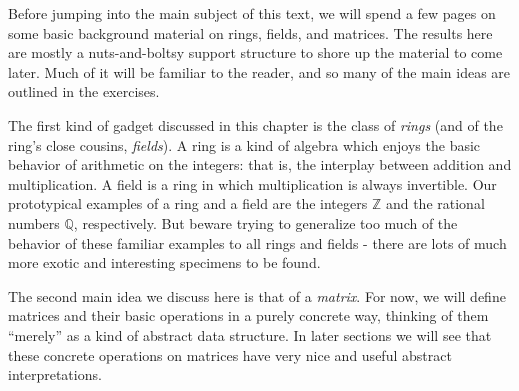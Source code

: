 
Before jumping into the main subject of this text, we will spend a few pages on some basic background material on rings, fields, and matrices. The results here are mostly a nuts-and-boltsy support structure to shore up the material to come later. Much of it will be familiar to the reader, and so many of the main ideas are outlined in the exercises.

The first kind of gadget discussed in this chapter is the class of \emph{rings} (and of the ring's close cousins, \emph{fields}). A ring is a kind of algebra which enjoys the basic behavior of arithmetic on the integers: that is, the interplay between addition and multiplication. A field is a ring in which multiplication is always invertible. Our prototypical examples of a ring and a field are the integers $\mathbb{Z}$ and the rational numbers $\mathbb{Q}$, respectively. But beware trying to generalize too much of the behavior of these familiar examples to all rings and fields - there are lots of much more exotic and interesting specimens to be found.

The second main idea we discuss here is that of a \emph{matrix}. For now, we will define matrices and their basic operations in a purely concrete way, thinking of them ``merely'' as a kind of abstract data structure. In later sections we will see that these concrete operations on matrices have very nice and useful abstract interpretations.